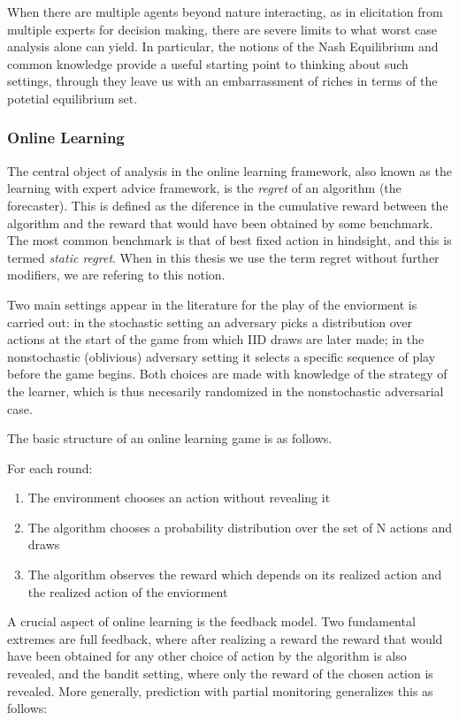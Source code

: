 When there are multiple agents beyond nature interacting, as in elicitation from multiple experts for decision making, there are severe limits to what worst case analysis alone can yield. 
In particular, the notions of the Nash Equilibrium \cite{nash1950equilibrium} and common knowledge \cite{aumann1976agreeing} provide a useful starting point to thinking about such settings, through they leave us with an embarrassment of riches in terms of the potetial equilibrium set.



\subsubsection{Online Learning}


The central object of analysis in the online learning framework, also known as the learning with expert advice framework, is the \emph{regret} of an algorithm (the forecaster). This is defined as the diference in the cumulative reward between the algorithm and the reward that would have been obtained by some benchmark. 
The most common benchmark is that of best fixed action in hindsight, and this is termed \emph{static regret}. 
When in this thesis we use the term regret without further modifiers, we are refering to this notion.

Two main settings appear in the literature for the play of the enviorment is carried out: in the stochastic setting an adversary picks a distribution over actions at the start of the game from which IID draws are later made; in the nonstochastic (oblivious) adversary setting it selects a specific sequence of play before the game begins. Both choices are made with knowledge of the strategy of the learner, which is thus necesarily randomized in the nonstochastic adversarial case.

The basic structure of an online learning game is as follows.

For each round:
\begin{enumerate}
\item The environment chooses an action without revealing it
\item The algorithm chooses a probability distribution over the set of N actions and draws
\item The algorithm observes the reward which depends on its realized action and the realized action of the enviorment
\end{enumerate}

A crucial aspect of online learning is the feedback model. Two fundamental extremes are full feedback, where after realizing a reward the reward that would have been obtained for any other choice of action by the algorithm is also revealed, and the bandit setting, where only the reward of the chosen action is revealed. 
More generally, prediction with partial monitoring \cite{cesa2006regret} generalizes this as follows:

